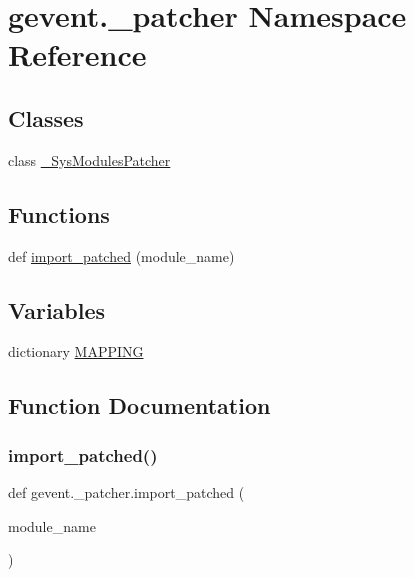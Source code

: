 \hypertarget{namespacegevent_1_1__patcher}{}\section{gevent.\+\_\+patcher Namespace Reference}
\label{namespacegevent_1_1__patcher}
\subsection*{Classes}
\begin{DoxyCompactItemize}
\item 
class \hyperlink{classgevent_1_1__patcher_1_1___sys_modules_patcher}{\+\_\+\+Sys\+Modules\+Patcher}
\end{DoxyCompactItemize}
\subsection*{Functions}
\begin{DoxyCompactItemize}
\item 
def \hyperlink{namespacegevent_1_1__patcher_ace08ff5809237ce00d7d3ee28f479d81}{import\+\_\+patched} (module\+\_\+name)
\end{DoxyCompactItemize}
\subsection*{Variables}
\begin{DoxyCompactItemize}
\item 
dictionary \hyperlink{namespacegevent_1_1__patcher_ab66571021c8a310fda9de5b9e4a2d204}{M\+A\+P\+P\+I\+NG}
\end{DoxyCompactItemize}


\subsection{Function Documentation}
\mbox{\label{namespacegevent_1_1__patcher_ace08ff5809237ce00d7d3ee28f479d81}} 
\subsubsection{\texorpdfstring{import\+\_\+patched()}{import\_patched()}}
{\footnotesize\ttfamily def gevent.\+\_\+patcher.\+import\+\_\+patched (\begin{DoxyParamCaption}\item[{}]{module\+\_\+name }\end{DoxyParamCaption})}

